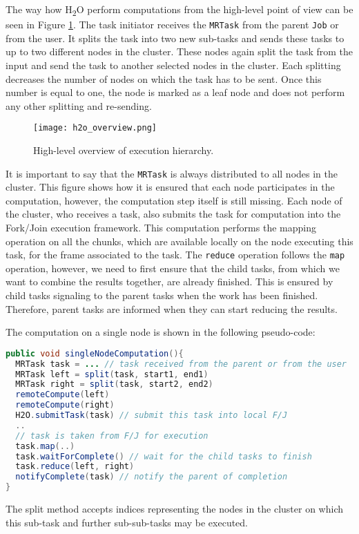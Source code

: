 The way how H\textsubscript{2}O perform computations from the high-level point of view can be seen in Figure \ref{fig:h2o_overview}. The task initiator receives the \texttt{MRTask} from the parent \texttt{Job} or from the user. It splits the task into two new sub-tasks and sends these tasks to up to two different nodes in the cluster. These nodes again split the task from the input and send the task to another selected nodes in the cluster. Each splitting decreases the number of nodes on which the task has to be sent. Once this number is equal to one, the node is marked as a leaf node and does not perform any other splitting and re-sending.

\begin{figure}
	\centering
	\texttt{[image: h2o\_overview.png]}
	\caption{High-level overview of execution hierarchy.}
	\label{fig:h2o_overview}
\end{figure}

It is important to say that the \texttt{MRTask} is always distributed to all nodes in the cluster. This figure shows how it is ensured that each node participates in the computation, however, the computation step itself is still missing. Each node of the cluster, who receives a task, also submits the task for computation into the Fork/Join execution framework. This computation performs the mapping operation on all the chunks, which are available locally on the node executing this task, for the frame associated to the task. The \texttt{reduce} operation follows the \texttt{map} operation, however, we need to first ensure that the child tasks, from which we want to combine the results together, are already finished. This is ensured by child tasks signaling to the parent tasks when the work has been finished. Therefore, parent tasks are informed when they can start reducing the results. 

The computation on a single node is shown in the following pseudo-code:
\begin{lstlisting}[language=Java]
public void singleNodeComputation(){
  MRTask task = ... // task received from the parent or from the user
  MRTask left = split(task, start1, end1)
  MRTask right = split(task, start2, end2)
  remoteCompute(left)
  remoteCompute(right)
  H2O.submitTask(task) // submit this task into local F/J
  ..
  // task is taken from F/J for execution
  task.map(..)
  task.waitForComplete() // wait for the child tasks to finish
  task.reduce(left, right)
  notifyComplete(task) // notify the parent of completion
}
\end{lstlisting}
The split method accepts indices representing the nodes in the cluster on which this sub-task and further sub-sub-tasks may be executed.

